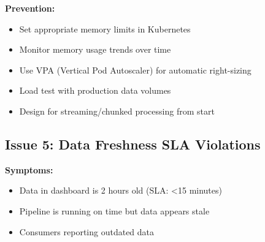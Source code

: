 \textbf{Prevention:}
\begin{itemize}
    \item Set appropriate memory limits in Kubernetes
    \item Monitor memory usage trends over time
    \item Use VPA (Vertical Pod Autoscaler) for automatic right-sizing
    \item Load test with production data volumes
    \item Design for streaming/chunked processing from start
\end{itemize}

\subsection{Issue 5: Data Freshness SLA Violations}

\textbf{Symptoms:}
\begin{itemize}
    \item Data in dashboard is 2 hours old (SLA: <15 minutes)
    \item Pipeline is running on time but data appears stale
    \item Consumers reporting outdated data
\end{itemize}

